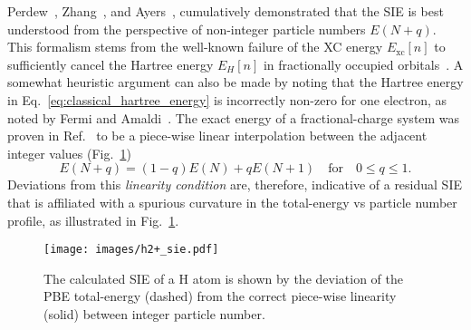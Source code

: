 Perdew~\cite{PhysRevLett.49.1691}, 
Zhang~\cite{doi:10.1063/1.476859}, 
and Ayers~\cite{Ayers2008}, 
cumulatively demonstrated that the SIE 
is best understood 
from the perspective {of} non-integer particle numbers 
 $E(N+q)$.
%
This formalism stems from 
the well-known failure of the XC energy 
$E_\textrm{xc}[n]$ 
to sufficiently cancel 
the Hartree energy $E_H[n]$ 
in fractionally occupied orbitals~\cite{PhysRevLett.100.146401}.
%
A somewhat heuristic argument 
can also be made by noting that the Hartree energy 
in Eq.~\eqref{eq:classical_hartree_energy} 
is incorrectly non-zero for one electron, 
as noted by Fermi and Amaldi~\cite{fermi1934mem}.
% 
The exact energy of a 
fractional-charge system  
was proven in Ref.~\cite{PhysRevLett.49.1691} 
to be a piece-wise linear interpolation
between the adjacent integer values (Fig.~\ref{fig:h2+_sie})
%
\begin{equation}
E(N+q)=(1-q)E(N)+qE(N+1) 
\quad\mbox{for}\quad
0\leq q\leq 1. 
\label{eq:linearity_condition}
\end{equation}
%
Deviations from this {\it linearity condition} 
are, therefore, indicative of a residual SIE 
that is affiliated with a spurious curvature   
in the total-energy vs particle number profile, 
as illustrated in Fig.~\ref{fig:h2+_sie}.

 \begin{figure}[th!]
 \centering
 \texttt{[image: images/h2+\_sie.pdf]}
 \caption[SIE of a H atom as the deviation from piece-wise linearity]
 {The calculated SIE of a H atom 
 is shown by the deviation 
 of the PBE total-energy (dashed) 
 from the correct piece-wise linearity (solid)
 between integer particle number.}
 \label{fig:h2+_sie}
 \end{figure}


